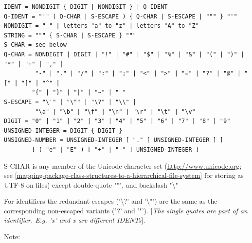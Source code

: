 \documentclass[10pt,a4paper]{report}
\begin{document}
\begin{lstlisting}[language=grammar]
IDENT = NONDIGIT { DIGIT | NONDIGIT } | Q-IDENT
Q-IDENT = "'" ( Q-CHAR | S-ESCAPE ) { Q-CHAR | S-ESCAPE | """ } "'"
NONDIGIT = "_" | letters "a" to "z" | letters "A" to "Z"
STRING = """ { S-CHAR | S-ESCAPE } """
S-CHAR = see below
Q-CHAR = NONDIGIT | DIGIT | "!" | "#" | "$" | "%" | "&" | "(" | ")" | "*" | "+" | "," |
         "-" | "." | "/" | ":" | ";" | "<" | ">" | "=" | "?" | "@" | "[" | "]" | "^" |
        "{" | "}" | "|" | "~" | " "
S-ESCAPE = "\'" | "\"" | "\?" | "\\" |
         "\a" | "\b" | "\f" | "\n" | "\r" | "\t" | "\v"
DIGIT = "0" | "1" | "2" | "3" | "4" | "5" | "6" | "7" | "8" | "9"
UNSIGNED-INTEGER = DIGIT { DIGIT }
UNSIGNED-NUMBER = UNSIGNED-INTEGER [ "." [ UNSIGNED-INTEGER ] ]
        [ ( "e" | "E" ) [ "+" | "-" ] UNSIGNED-INTEGER ]
\end{lstlisting}
\textrm{S-CHAR} is any member of the Unicode character set
(\url{http://www.unicode.org}; see \ref{mapping-package-class-structures-to-a-hierarchical-file-system} for storing as UTF-8 on files) except double-quote """, and backslash "\textbackslash{}"

For identifiers the redundant escapes ('\textbackslash{}?' and
'\textbackslash{}"') are the same as the corresponding non-escaped
variants ('?' and '"'). {[}\emph{The single quotes are part of an
identifier. E.g. 'x' and x are different IDENTs}{]}.

Note:
\end{document}
